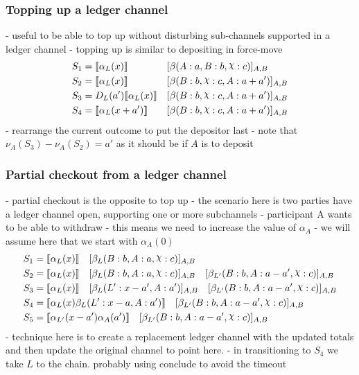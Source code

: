 \documentclass{article}
\DeclareRobustCommand{\rchi}{{\mathpalette\irchi\relax}}
\newcommand{\irchi}[2]{\raisebox{\depth}{$#1\chi$}} %
\theoremstyle{definition}
\newcommand{\adj}[1]{\llbracket #1 \rrbracket}
\newcommand{\enf}[1]{[#1]}
\begin{document}
\subsubsection{Topping up a ledger channel}

- useful to be able to top up without disturbing sub-channels supported in a ledger channel
- topping up is similar to depositing in force-move
\begin{align*}
S_1 &= \adj{\alpha_L(x)} &&\enf{\beta(A: a, B: b, \rchi: c)}_{A, B} \\
S_2 &= \adj{\alpha_L(x)} &&\enf{\beta(B: b, \rchi: c, A: a + a')}_{A, B} \\
S_3 &= D_L(a')\adj{\alpha_L(x)} &&\enf{\beta(B: b, \rchi: c, A: a + a')}_{A, B} \\
S_4 &= \adj{\alpha_L(x + a')} &&\enf{\beta(B: b, \rchi: c, A: a + a')}_{A, B}
\end{align*}
- rearrange the current outcome to put the depositor last
- note that $\nu_A(S_3) - \nu_A(S_2) = a'$ as it should be if $A$ is to deposit

\subsubsection{Partial checkout from a ledger channel}

- partial checkout is the opposite to top up
- the scenario here is two parties have a ledger channel open, supporting one or more subchannels
- participant A wants to be able to withdraw 
- this means we need to increase the value of $\alpha_A$ 
- we will assume here that we start with $\alpha_A(0)$
\begin{align*}
S_1 &= \adj{\alpha_L(x)} \quad \enf{\beta_L(B: b, A: a, \rchi: c)}_{A, B}  \\
S_2 &= \adj{\alpha_L(x)} \quad \enf{\beta_L(B: b, A: a, \rchi: c)}_{A, B} \quad \enf{\beta_{L'}(B: b, A: a - a', \rchi: c)}_{A, B}\\
S_3 &= \adj{\alpha_L(x)} \quad \enf{\beta_L(L': x-a', A: a')}_{A, B} \quad \enf{\beta_{L'}(B: b, A: a - a', \rchi: c)}_{A, B}\\
S_4 &= \adj{\alpha_L(x)\beta_L(L': x-a, A: a')} \quad \enf{\beta_{L'}(B: b, A: a - a', \rchi: c)}_{A, B}\\
S_5 &= \adj{\alpha_{L'}(x-a')\alpha_A(a')} \quad \enf{\beta_{L'}(B: b, A: a - a', \rchi: c)}_{A, B}
\end{align*}
- technique here is to create a replacement ledger channel with the updated totals and then update the 
  original channel to point here.
- in transitioning to $S_4$ we take $L$ to the chain. probably using conclude to avoid the timeout
\end{document}
